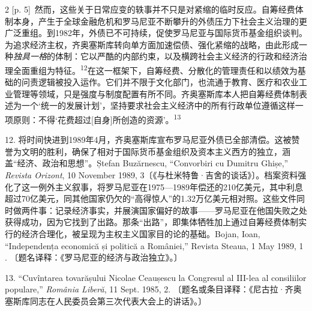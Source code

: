\documentclass[10pt,a4paper]{article}
\begin{document}
\begin{paracol}{2}
{\scriptsize\color{gray} [p. 5]}\ 然而，这些关于日常应变的轶事并不只是对紧缩的临时反应。自筹经费体制本身，产生于全球金融危机和罗马尼亚不断攀升的外债压力下社会主义治理的更广泛重组。到1982年，外债已不可持续，促使罗马尼亚与国际货币基金组织谈判。为追求经济主权，齐奥塞斯库转向单方面加速偿债、强化紧缩的战略，由此形成一种\textit{独具一格}的体制：它以严酷的内部约束，以及横跨社会主义经济的行政和经济治理全面重组为特\mbox{征。\textsuperscript{12}}在这一框架下，自筹经费、分散化的管理责任和以绩效为基础的问责逻辑被投入运作。它们并不限于文化部门，也流通于教育、医疗和农业工业管理等领域，只是强度与制度配置有所不同。齐奥塞斯库本人把自筹经费体制表述为一个‘统一的发展计划’，坚持要求社会主义经济中的所有行政单位遵循这样一项原则：不得‘花费超过[自身]所创造的资源’。\nobreak\textsuperscript{13}\par{\small 12. 将时间快进到1989年4月，齐奥塞斯库宣布罗马尼亚外债已全部清偿。这被赞誉为文明的胜利，确保了相对于国际货币基金组织及资本主义西方的独立，涵盖“经济、政治和思想”。Ștefan Buzărnescu, “Convorbiri cu Dumitru Ghișe,” \textit{Revista Orizont}, 10 November 1989, 3〔《与杜米特鲁·吉舍的谈话》〕。档案资料强化了这一例外主义叙事，将罗马尼亚在1975—1989年偿还的210亿美元，其中利息超过70亿美元，同其他国家仍欠的“高得惊人”的1.32万亿美元相对照。这些文件同时做两件事：记录经济事实，并展演国家偏好的故事——罗马尼亚在他国失败之处获得成功，因为它找到了出路。那条“出路”，即集体牺牲加上通过自筹经费体制实行的经济合理化，被呈现为主权主义国家目的论的基础。Bojan, Ioan, “Independența economică și politică a României,” Revista Steaua, 1 May 1989, 1 . 〔题名译释：《罗马尼亚的经济与政治独立》。〕\par}{\small 13. “Cuvîntarea tovarășului Nicolae Ceaușescu la Congresul al III-lea al consiliilor populare,” \textit{România Liberă}, 11 Sept. 1985, 2. 〔题名或条目译释：《尼古拉·齐奥塞斯库同志在人民委员会第三次代表大会上的讲话》。〕\par}
\switchcolumn

\end{paracol}
\end{document}
